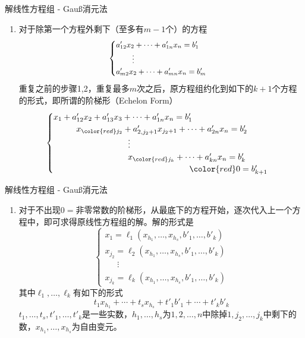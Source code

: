 \begin{frame}{解线性方程组 - Gau{\ss}消元法}

\begin{enumerate}\addtocounter{enumi}{2}
\item 对于除第一个方程外剩下（{\color{red}至多}有$m-1$个）的方程
$$
\small
\begin{cases}
a'_{12}x_2 + \cdots + a'_{1n}x_n = b'_1 \\
\phantom{yyyy} \vdots \\
a'_{m2}x_2 + \cdots + a'_{mn}x_n = b'_m
\end{cases}$$
重复之前的步骤1,2，重复最多$m$次之后，原方程组约化到如下的$k+1$个方程的形式，即所谓的阶梯形（Echelon Form）
$$
\begin{cases}
x_1 + a'_{12}x_2 + a'_{13}x_3 + \cdots + a'_{1n}x_n = b'_1 \\
\phantom{x_1 + 1} x_{\color{red} j_2} + a'_{2,j_2+1}x_{j_2+1} + \cdots + a'_{2n}x_n = b'_2 \\
\phantom{yyyyyyyyyyyyyyyyy} \vdots \\
\phantom{yyyyyyyyyyyyyyyyy} x_{\color{red} j_k} + \cdots + a'_{kn}x_n = b'_k \\
\phantom{yyyyyyyyyyyyyyyyyyyyyyyyyyyyyyy} {\color{red} 0 = b'_{k+1}}
\end{cases}$$
\end{enumerate}

\end{frame}


\begin{frame}{解线性方程组 - Gau{\ss}消元法}

\begin{enumerate}\addtocounter{enumi}{3}
\item 对于{\color{red}不出现$0 = $非零常数的阶梯形}，从最底下的方程开始，逐次代入上一个方程中，即可求得原线性方程组的解。解的形式是
$$\begin{cases}
x_1 = \ell_1(x_{h_1},\ldots,x_{h_s},b'_1,\ldots,b'_k) \\
x_{j_2} = \ell_2(x_{h_1},\ldots,x_{h_s},b'_1,\ldots,b'_k) \\
\phantom{yyy} \vdots \\
x_{j_k} = \ell_k(x_{h_1},\ldots,x_{h_s},b'_1,\ldots,b'_k)
\end{cases}$$
其中$\ell_1,\ldots,\ell_k$有如下的形式
$$t_1x_{h_1}+\cdots+t_sx_{h_s}+t'_1b'_1+\cdots+t'_kb'_k$$
$t_1,\ldots,t_s,t'_1,\ldots,t'_k$是一些实数，$h_1,\ldots,h_s$为$1,2,\ldots,n$中除掉$1,j_2,\ldots,j_k$中剩下的数，$x_{h_1},\ldots,x_{h_s}$为自由变元。
\end{enumerate}

\end{frame}


